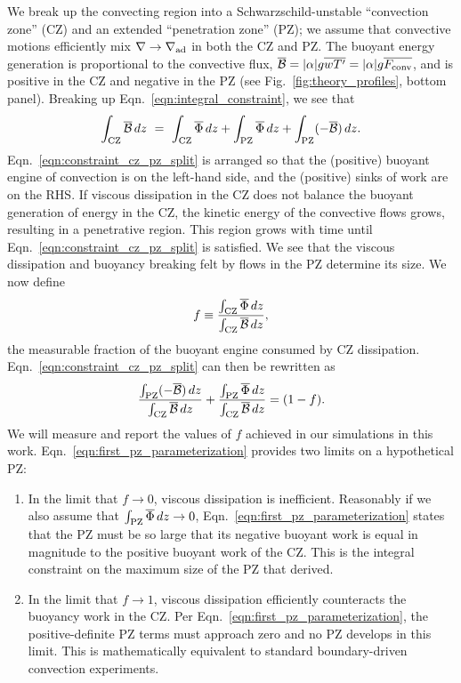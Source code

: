 \documentclass[twocolumn]{aastex631}
\newcommand{\gradad}{\ensuremath{\nabla_{\rm{ad}}}}
\newcommand{\justgrad}{\ensuremath{\nabla}}
\newcommand{\Fconv}{\ensuremath{F_{\rm{conv}}}}
\renewcommand{\bar}[1]{\overline{#1}}
\begin{document}
We break up the convecting region into a Schwarzschild-unstable ``convection zone'' (CZ) and an extended ``penetration zone'' (PZ); we assume that convective motions efficiently mix $\justgrad \rightarrow \gradad$ in both the CZ and PZ.
The buoyant energy generation is proportional to the convective flux, $\bar{\mathcal{B}} = |\alpha|g\bar{w T'} = |\alpha| g \bar{\Fconv}$, and is positive in the CZ and negative in the PZ (see Fig.~\ref{fig:theory_profiles}, bottom panel).
Breaking up Eqn.~\ref{eqn:integral_constraint}, we see that
\begin{equation}
\int_{\rm{CZ}} \bar{\mathcal{B}}\,dz \,\,=\,\,
\int_{\rm{CZ}} \bar{\Phi}\,dz + \int_{\rm{PZ}} \bar{\Phi}\,dz + \int_{\rm{PZ}}(-\bar{\mathcal{B}})\,dz.
\label{eqn:constraint_cz_pz_split}
\end{equation}
Eqn.~\ref{eqn:constraint_cz_pz_split} is arranged so that the (positive) buoyant engine of convection is on the left-hand side, and the (positive) sinks of work are on the RHS.
If viscous dissipation in the CZ does not balance the buoyant generation of energy in the CZ, the kinetic energy of the convective flows grows, resulting in a penetrative region.
This region grows with time until Eqn.~\ref{eqn:constraint_cz_pz_split} is satisfied.
We see that the viscous dissipation and buoyancy breaking felt by flows in the PZ determine its size.
We now define
\begin{equation}
f \equiv \frac{\int_{\rm{CZ}} \bar{\Phi}\,dz}{\int_{\rm{CZ}}\bar{\mathcal{B}}\,dz},
\label{eqn:f_defn}
\end{equation}
the measurable fraction of the buoyant engine consumed by CZ dissipation.
Eqn.~\ref{eqn:constraint_cz_pz_split} can then be rewritten as
\begin{equation}
\frac{\int_{\rm{PZ}}(-\bar{\mathcal{B}})\,dz}{\int_{\rm{CZ}} \bar{\mathcal{B}}\,dz}
+ \frac{\int_{\rm{PZ}} \bar{\Phi}\,dz }{\int_{\rm{CZ}} \bar{\mathcal{B}}\,dz}
= (1 - f).
\label{eqn:first_pz_parameterization}
\end{equation}
We will measure and report the values of $f$ achieved in our simulations in this work.
Eqn.~\ref{eqn:first_pz_parameterization} provides two limits on a hypothetical PZ:
\begin{enumerate}
\item In the limit that $f \rightarrow 0$, viscous dissipation is inefficient.
Reasonably if we also assume that $\int_{\rm{PZ}}\bar{\Phi}\,dz \rightarrow 0$, Eqn.~\ref{eqn:first_pz_parameterization} states that the PZ must be so large that its negative buoyant work is equal in magnitude to the positive buoyant work of the CZ.
This is the integral constraint on the maximum size of the PZ that \citet{roxburgh1989} derived.
\item In the limit that $f \rightarrow 1$, viscous dissipation efficiently counteracts the buoyancy work in the CZ.
Per Eqn.~\ref{eqn:first_pz_parameterization}, the positive-definite PZ terms must approach zero and no PZ develops in this limit.
This is mathematically equivalent to standard boundary-driven convection experiments.
\end{enumerate}
\end{document}
